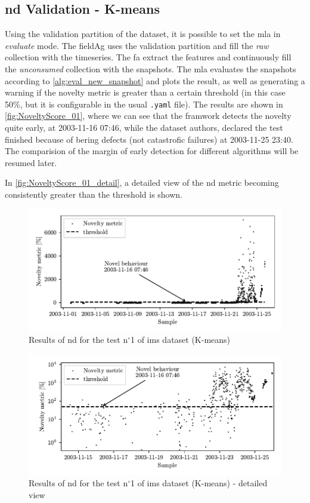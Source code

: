 \subsection{\gls{nd} Validation - K-means}
Using the validation partition of the dataset, it is possible to set the \gls{mla} in \emph{evaluate} mode. The \gls{fieldAg} uses the validation partition and fill the \emph{raw} collection with the timeseries. The {\gls{fa}} extract the features and continuously fill the \emph{unconsumed} collection with the snapshots. The \gls{mla} evaluates the snapshots according to \autoref{alg:eval_new_snapshot}  and plots the result, as well as generating a warning if the novelty metric is greater than a certain threshold (in this case 50\%, but it is configurable in the usual \texttt{.yaml} file). The results are shown in \autoref{fig:NoveltyScore_01}, where we can see that the framwork detects the novelty quite early, at 2003-11-16 07:46, while the dataset authors, declared the test finished because of bering defects (not catastrofic failures) at 2003-11-25 23:40. The comparision of the margin of early detection for different algorithms will be resumed later.

In \autoref{fig:NoveltyScore_01_detail}, a detailed view of the \gls{nd} metric becoming consistently greater than the threshold is shown.

\begin{figure}
    \centering
    \includegraphics{images/IMS/Novelty_01_500samples_bearing3x.pdf}
    \caption{Results of \gls{nd} for the test $\text{n}^\circ$1 of \gls{ims} dataset (K-means)}
    \label{fig:NoveltyScore_01} 
\end{figure}

\begin{figure}
    \centering
    \includegraphics{images/IMS/Novelty_01_500samples_bearing3x_detail.pdf}
    \caption{Results of \gls{nd} for the test $\text{n}^\circ$1 of \gls{ims} dataset (K-means) - detailed view}
    \label{fig:NoveltyScore_01_detail} 
\end{figure}


